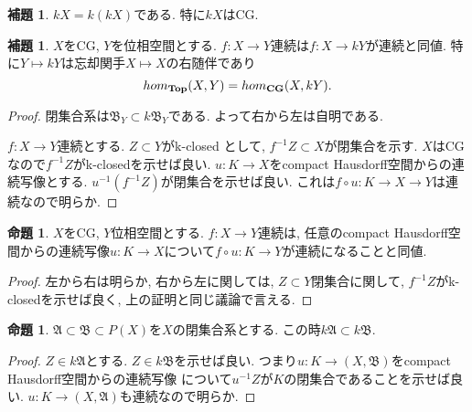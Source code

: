 \documentclass[dvipdfmx,a4paper,11pt]{article}
\theoremstyle{definition}
\newtheorem{lem}[thm]{補題}
\newtheorem{prop}[thm]{命題}
\begin{document}
 \begin{tcolorbox}
 [colback = white, colframe = green!35!black, fonttitle = \bfseries,breakable = true]
\begin{lem}\cite[Cor1.9]{Str}
$kX =k(kX)$である. 特に$kX$はCG.
\end{lem}
\end{tcolorbox}

 \begin{tcolorbox}
 [colback = white, colframe = green!35!black, fonttitle = \bfseries,breakable = true]
\begin{lem}\cite[Cor1.10]{Str}
\label{Str-cor1.10}
$X$をCG, $Y$を位相空間とする. 
$f : X \to Y$連続は$f : X \to kY$が連続と同値. 
特に$Y \mapsto kY$は忘却関手$X \mapsto X$の右随伴であり
$$
hom_{{\bf Top}}(X, Y) = hom_{{\bf CG}}(X, kY).
$$
\end{lem}
\end{tcolorbox}

\begin{proof}
閉集合系は$\mathfrak{B}_Y \subset k\mathfrak{B}_Y$である.
よって右から左は自明である.

$f : X \to Y$連続とする. $Z \subset Y$がk-closed として, $f^{-1}Z \subset X$が閉集合を示す.
$X$はCGなので$f^{-1}Z$がk-closedを示せば良い.
$u : K \to X$をcompact Hausdorff空間からの連続写像とする.
$u^{-1}(f^{-1}Z )$が閉集合を示せば良い. これは$f \circ u : K \to X \to Y$は連続なので明らか.
\end{proof}

 \begin{tcolorbox}
 [colback = white, colframe = green!35!black, fonttitle = \bfseries,breakable = true]
\begin{prop}\cite[Prop1.11]{Str}
$X$をCG, $Y$位相空間とする. 
$f : X \to Y$連続は, 
任意のcompact Hausdorff空間からの連続写像$u : K \to X$について$f \circ u : K \to Y$が連続になることと同値.
\end{prop}
\end{tcolorbox}

\begin{proof}
左から右は明らか, 右から左に関しては, 
$Z \subset Y$閉集合に関して, $f^{-1}Z$がk-closedを示せば良く, 上の証明と同じ議論で言える. 
\end{proof}

 \begin{tcolorbox}
 [colback = white, colframe = green!35!black, fonttitle = \bfseries,breakable = true]
\begin{prop}\cite[Prop1.12]{Str}
$\mathfrak{A} \subset \mathfrak{B} \subset P(X)$を$X$の閉集合系とする. 
この時$k\mathfrak{A} \subset k\mathfrak{B}$.
\end{prop}
\end{tcolorbox}
\begin{proof}
$Z \in k\mathfrak{A} $とする. $Z \in k \mathfrak{B}$を示せば良い. 
つまり$u : K \to (X, \mathfrak{B})$をcompact Hausdorff空間からの連続写像
について$u^{-1}Z$が$K$の閉集合であることを示せば良い. 
$u : K \to (X, \mathfrak{A})$も連続なので明らか.
\end{proof}
\end{document}
